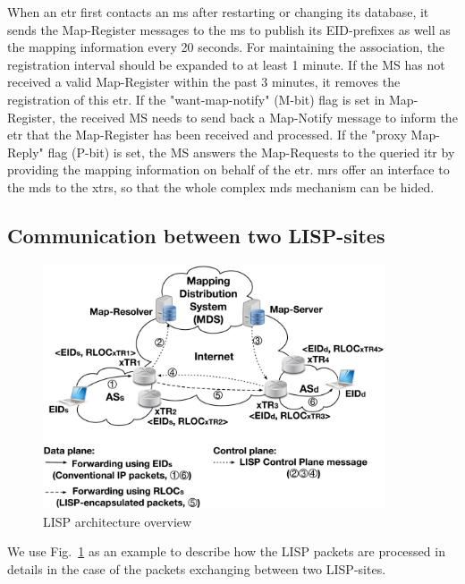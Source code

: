 When an \acrshort{etr} first contacts an \acrshort{ms} after restarting or changing its database, it sends the Map-Register messages to the \acrshort{ms} to publish its EID-prefixes as well as the mapping information every 20 seconds. For maintaining the association, the registration interval should be expanded to at least 1 minute. If the MS has not received a valid Map-Register within the past 3 minutes, it removes the registration of this \acrshort{etr}. If the "want-map-notify" (M-bit) flag is set in Map-Register, the received MS needs to send back a Map-Notify message to inform the \acrshort{etr} that the Map-Register has been received and processed. If the "proxy Map-Reply" flag (P-bit) is set, the MS answers the Map-Requests to the queried \acrshort{itr} by providing the mapping information on behalf of the \acrshort{etr}. \acrshort{mr}s offer an interface to the \acrshort{mds} to the \acrshort{xtr}s, so that the whole complex \acrshort{mds} mechanism can be hided.


\subsection{Communication between two LISP-sites}
\label{sec:communication_2_lisp}
\begin{figure}[!t]
	\centering
	\includegraphics[width=0.9\textwidth]{Pics/LISP_D_C_planes.eps}
	\caption{LISP architecture overview}
	\label{LISP_archi}
\end{figure}
We use Fig.~\ref{LISP_archi} as an example to describe how the LISP packets are processed in details in the case of the packets exchanging between two LISP-sites.

